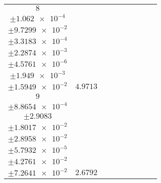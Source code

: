 \documentclass[8pt]{article}
\begin{document}
\begin{longtable}[l]{c c c c c c c c c}
$\num{8}$ & \begin{tabular}[c]{@{}c@{}}$\num{6.0081e-2}$ \\ $\pm\num{1.062e-4}$\end{tabular} & \begin{tabular}[c]{@{}c@{}}$\num{-1.0637}$ \\ $\pm\num{9.7299e-2}$\end{tabular} & \begin{tabular}[c]{@{}c@{}}$\num{10.344}$ \\ $\pm\num{3.3183e-4}$\end{tabular} & \begin{tabular}[c]{@{}c@{}}$\num{1.5762e+3}$ \\ $\pm\num{2.2874e-3}$\end{tabular} & \begin{tabular}[c]{@{}c@{}}$\num{3.1534}$ \\ $\pm\num{4.5761e-6}$\end{tabular} & \begin{tabular}[c]{@{}c@{}}$\num{1.1637}$ \\ $\pm\num{1.949e-3}$\end{tabular} & \begin{tabular}[c]{@{}c@{}}$\num{4.1066}$ \\ $\pm\num{1.5949e-2}$\end{tabular} & $\num{4.9713}$\\
$\num{9}$ & \begin{tabular}[c]{@{}c@{}}$\num{4.1446e-2}$ \\ $\pm\num{8.8654e-4}$\end{tabular} & \begin{tabular}[c]{@{}c@{}}$\num{-1.6481}$ \\ $\pm\num{2.9083}$\end{tabular} & \begin{tabular}[c]{@{}c@{}}$\num{1.9187}$ \\ $\pm\num{1.8017e-2}$\end{tabular} & \begin{tabular}[c]{@{}c@{}}$\num{1.5765e+3}$ \\ $\pm\num{2.8958e-2}$\end{tabular} & \begin{tabular}[c]{@{}c@{}}$\num{3.1538}$ \\ $\pm\num{5.7932e-5}$\end{tabular} & \begin{tabular}[c]{@{}c@{}}$\num{3.3416}$ \\ $\pm\num{4.2761e-2}$\end{tabular} & \begin{tabular}[c]{@{}c@{}}$\num{5.2742}$ \\ $\pm\num{7.2641e-2}$\end{tabular} & $\num{2.6792}$\\

\end{longtable}
\end{document}
